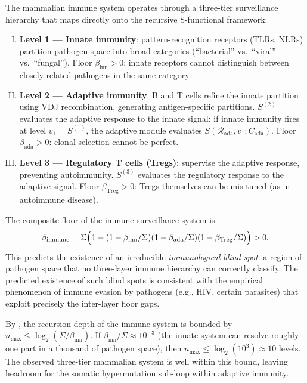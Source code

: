 \begin{example}
\label{ex:ch02-immune-recursion}
The mammalian immune system operates through a three-tier surveillance hierarchy
that maps directly onto the recursive S-functional framework:
\begin{enumerate}[(I)]
  \item \textbf{Level 1 --- Innate immunity}: pattern-recognition receptors (TLRs,
    NLRs) partition pathogen space into broad categories (``bacterial'' vs.\
    ``viral'' vs.\ ``fungal'').  Floor $\beta_{\mathrm{inn}} > 0$: innate
    receptors cannot distinguish between closely related pathogens in the same
    category.
  \item \textbf{Level 2 --- Adaptive immunity}: B and T cells refine the innate
    partition using VDJ recombination, generating antigen-specific partitions.
    $S^{(2)}$ evaluates the adaptive response to the innate signal: if innate
    immunity fires at level $v_1 = S^{(1)}$, the adaptive module evaluates
    $S(\mathcal{R}_{\mathrm{ada}}, v_1; C_{\mathrm{ada}})$.  Floor
    $\beta_{\mathrm{ada}} > 0$: clonal selection cannot be perfect.
  \item \textbf{Level 3 --- Regulatory T cells (Tregs)}: supervise the adaptive
    response, preventing autoimmunity.  $S^{(3)}$ evaluates the regulatory
    response to the adaptive signal.  Floor $\beta_{\mathrm{Treg}} > 0$: Tregs
    themselves can be mis-tuned (as in autoimmune disease).
\end{enumerate}
The composite floor of the immune surveillance system is
\[
  \beta_{\mathrm{immune}}
  = \Sigma\Bigl(1 - (1-\beta_{\mathrm{inn}}/\Sigma)(1-\beta_{\mathrm{ada}}/\Sigma)
    (1-\beta_{\mathrm{Treg}}/\Sigma)\Bigr) > 0.
\]
This predicts the existence of an irreducible \emph{immunological blind spot}:
a region of pathogen space that no three-layer immune hierarchy can correctly
classify.  The predicted existence of such blind spots is consistent with the
empirical phenomenon of immune evasion by pathogens (e.g., HIV, certain
parasites) that exploit precisely the inter-layer floor gaps.

By , the recursion depth of the immune system is
bounded by $n_{\max} \leq \log_2(\Sigma/\beta_{\mathrm{inn}})$.  If
$\beta_{\mathrm{inn}}/\Sigma \approx 10^{-3}$ (the innate system can resolve
roughly one part in a thousand of pathogen space), then $n_{\max} \leq \log_2
(10^3) \approx 10$ levels.  The observed three-tier mammalian system is
well within this bound, leaving headroom for the somatic hypermutation
sub-loop within adaptive immunity.
\end{example}

